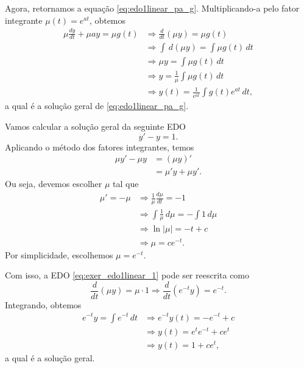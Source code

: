 Agora, retornamos a equação \eqref{eq:edo1linear_pa_g}. Multiplicando-a pelo fator integrante $\mu(t) = e^{at}$, obtemos
\begin{align}
  \mu\frac{dy}{dt} + \mu a y = \mu g(t) &\Rightarrow \frac{d}{dt}\left(\mu y\right) = \mu g(t) \\
                                        &\Rightarrow \int \,d(\mu y) = \int \mu g(t)\,dt \\
                                        &\Rightarrow \mu y = \int \mu g(t)\,dt \\
                                        &\Rightarrow y = \frac{1}{\mu}\int \mu g(t)\,dt \\
                                        &\Rightarrow y(t) = \frac{1}{e^{at}}\int g(t)e^{at}\,dt,
\end{align}
a qual é a solução geral de \eqref{eq:edo1linear_pa_g}.

\begin{ex}
  Vamos calcular a solução geral da seguinte EDO
  \begin{equation}\label{eq:exer_edo1linear_1}
    y' - y = 1. 
  \end{equation}
  Aplicando o método dos fatores integrantes, temos
  \begin{align}
    \mu y' - \mu y &= (\mu y)' \\
                   &= \mu' y + \mu y'.
  \end{align}
  Ou seja, devemos escolher $\mu$ tal que
  \begin{align}
    \mu' = -\mu &\Rightarrow \frac{1}{\mu}\frac{d\mu}{dt} = -1 \\
                &\Rightarrow \int \frac{1}{\mu}\,d\mu = -\int 1\,d\mu \\
                &\Rightarrow \ln|\mu| = -t + c \\
                &\Rightarrow \mu = ce^{-t}.
  \end{align}
  Por simplicidade, escolhemos $\mu = e^{-t}$.

  Com isso, a EDO \eqref{eq:exer_edo1linear_1} pode ser reescrita como
  \begin{equation}
    \frac{d}{dt}\left(\mu y\right) = \mu\cdot 1 \Rightarrow \frac{d}{dt}\left(e^{-t}y\right) = e^{-t}.
  \end{equation}
  Integrando, obtemos
  \begin{align}
    e^{-t}y = \int e^{-t}\,dt &\Rightarrow e^{-t}y(t) = -e^{-t} + c \\
                              &\Rightarrow y(t) = e^te^{-t} + ce^{t} \\
                              &\Rightarrow y(t) =  1 + ce^{t},
  \end{align}
  a qual é a solução geral.
\end{ex}

